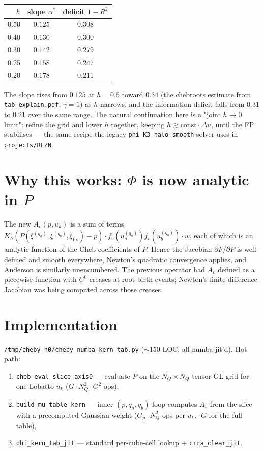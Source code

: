 \documentclass[11pt]{article}
\begin{document}
\begin{center}
\begin{tabular}{rcc}
\toprule
$h$ & slope $\alpha^*$ & deficit $1-R^2$ \\
\midrule
0.50 & $0.125$ & $0.308$ \\
0.40 & $0.130$ & $0.300$ \\
0.30 & $0.142$ & $0.279$ \\
0.25 & $0.158$ & $0.247$ \\
0.20 & $0.178$ & $0.211$ \\
\bottomrule
\end{tabular}
\end{center}

The slope rises from $0.125$ at $h{=}0.5$ toward $0.34$ (the
chebroots estimate from \texttt{tab\_explain.pdf}, $\gamma{=}1$) as $h$
narrows, and the information deficit falls from $0.31$ to $0.21$ over
the same range. The natural continuation here is a "joint $h{\to}0$
limit": refine the grid and lower $h$ together, keeping
$h \gtrsim \mathrm{const}\!\cdot\!\Delta u$, until the FP stabilises ---
the same recipe the legacy \texttt{phi\_K3\_halo\_smooth} solver uses
in \texttt{projects/REZN}.

\section{Why this works: $\Phi$ is now analytic in $P$}

The new $A_v(p, u_k)$ is a sum of terms
$K_h(P(\xi^{(q_a)}, \xi^{(q_b)}, \xi_{\text{fix}}) - p)
 \cdot f_v(u_a^{(q_a)}) f_v(u_b^{(q_b)}) \cdot w$,
each of which is an analytic function of the Cheb coefficients of $P$.
Hence the Jacobian $\partial F / \partial P$ is well-defined and smooth
everywhere, Newton's quadratic convergence applies, and Anderson is
similarly unencumbered. The previous operator had $A_v$ defined as a
piecewise function with $C^0$ creases at root-birth events; Newton's
finite-difference Jacobian was being computed across those creases.

\section{Implementation}

\texttt{/tmp/cheby\_h0/cheby\_numba\_kern\_tab.py} ($\sim 150$ LOC,
all numba-jit'd). Hot path:
\begin{enumerate}
  \item \texttt{cheb\_eval\_slice\_axis0} --- evaluate $P$ on the
        $N_{Q}{\times}N_Q$ tensor-GL grid for one Lobatto $u_k$
        ($G \cdot N_Q^2 \cdot G^2$ ops),
  \item \texttt{build\_mu\_table\_kern} --- inner $(p, q_a, q_b)$ loop
        computes $A_v$ from the slice with a precomputed Gaussian
        weight ($G_p \cdot N_Q^2$ ops per $u_k$, $\cdot G$ for the
        full table),
  \item \texttt{phi\_kern\_tab\_jit} --- standard per-cube-cell lookup
        + \texttt{crra\_clear\_jit}.
\end{enumerate}
\end{document}
